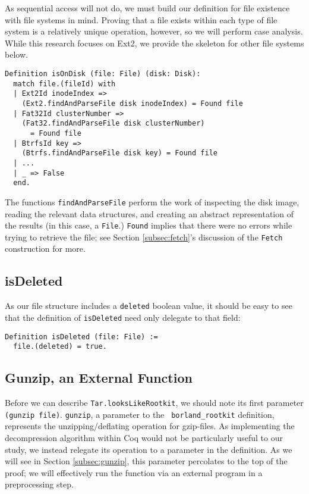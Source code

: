 \documentclass[nocopyrightspace]{sigplanconf}
\begin{document}
As sequential access will not do, we must build our definition for file
existence with file systems in mind. Proving that a file exists within each
type of file system is a relatively unique operation, however, so we will
perform case analysis. While this research focuses on Ext2, we provide the
skeleton for other file systems below.

\begin{lstlisting}
Definition isOnDisk (file: File) (disk: Disk):
  match file.(fileId) with
  | Ext2Id inodeIndex =>
    (Ext2.findAndParseFile disk inodeIndex) = Found file
  | Fat32Id clusterNumber =>
    (Fat32.findAndParseFile disk clusterNumber)
      = Found file
  | BtrfsId key =>
    (Btrfs.findAndParseFile disk key) = Found file
  | ...
  | _ => False
  end.
\end{lstlisting}

The functions {\tt findAndParseFile} perform the work of inspecting the disk
image, reading the relevant data structures, and creating an abstract
representation of the results (in this case, a {\tt File}.) {\tt Found}
implies that there were no errors while trying to retrieve the file; see
Section \ref{subsec:fetch}'s discussion of the {\tt Fetch} construction for
more.

\subsection{isDeleted}

As our file structure includes a {\tt deleted} boolean value, it should be
easy to see that the definition of {\tt isDeleted} need only delegate to that
field:

\begin{lstlisting}
Definition isDeleted (file: File) :=
  file.(deleted) = true.
\end{lstlisting}

\subsection{Gunzip, an External Function}

Before we can describe {\tt Tar.looksLikeRootkit}, we should note its first
parameter {\tt (gunzip file)}. {\tt gunzip}, a parameter to the {\tt
borland\_rootkit} definition, represents the unzipping/deflating operation for
gzip-files. As implementing the decompression algorithm within Coq would not
be particularly useful to our study, we instead relegate its operation to a
parameter in the definition. As we will see in Section \ref{subsec:gunzip},
this parameter percolates to the top of the proof; we will effectively run the
function via an external program in a preprocessing step.
\end{document}
